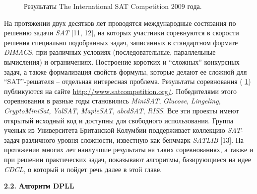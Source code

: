 \begin{figure}[h]
\centering
\captionsetup{justification=centering}
\caption{Результаты The International SAT Competition 2009 года.}
\label{chapter1:fig:satcomp}
\end{figure}

На протяжении двух десятков лет проводятся международные состязания по решению задачи \textit{SAT} [11, 12], на которых участники соревнуются в скорости решения специально подобранных задач, записанных в стандартном формате \textit{DIMACS}, при различных условиях (последовательные, параллельные вычисления) и ограничениях. Построение коротких и \enquote{сложных} конкурсных задач, а также формализация свойств формулы, которые делают ее сложной для \enquote{SAT}-решателя – отдельная интересная проблема. Результаты соревнования 
(\figurename{ \ref{chapter1:fig:satcomp}}) публикуются на сайте \url{http://www.satcompetition.org/}. Победителями этого соревнования в разные годы становились \textit{MiniSAT}, \textit{Glucose}, \textit{Lingeling}, \textit{CryptoMiniSat}, \textit{YalSAT}, \textit{MapleSAT}, \textit{abcdSAT}, \textit{RISS}. Все эти проекты имеют открытый исходный код и доступны для свободного использования. Группа ученых из Университета Британской Колумбии поддерживает коллекцию \textit{SAT}-задач различного уровня сложности, известную как бенчмарк \textit{SATLIB} [13]. На протяжении многих лет наилучшие результаты на таких соревнованиях, а также и при решении практических задач, показывают алгоритмы, базирующиеся на идее \textit{CDCL}, о который и пойдет речь далее в этой главе.

\vspace{5pt}
\textbf{2.2. Алгоритм DPLL}\label{chapters:2.2}
\vspace{5pt}

